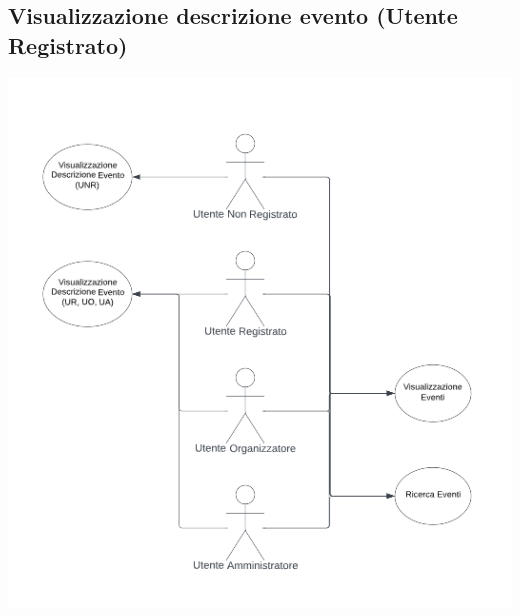 \documentclass{article}
\begin{document}
\subsection{Visualizzazione descrizione evento (Utente Registrato)}
\begin{center}
    \item[] \includegraphics[scale=0.7]{UseCase_1.png}
\end{center}
\end{document}
